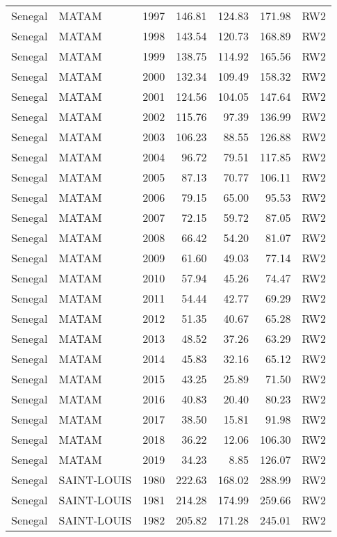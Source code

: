 \begin{longtable}{lllrrrl}
  Senegal & MATAM & 1997 & 146.81 & 124.83 & 171.98 & RW2 \\ 
  Senegal & MATAM & 1998 & 143.54 & 120.73 & 168.89 & RW2 \\ 
  Senegal & MATAM & 1999 & 138.75 & 114.92 & 165.56 & RW2 \\ 
  Senegal & MATAM & 2000 & 132.34 & 109.49 & 158.32 & RW2 \\ 
  Senegal & MATAM & 2001 & 124.56 & 104.05 & 147.64 & RW2 \\ 
  Senegal & MATAM & 2002 & 115.76 & 97.39 & 136.99 & RW2 \\ 
  Senegal & MATAM & 2003 & 106.23 & 88.55 & 126.88 & RW2 \\ 
  Senegal & MATAM & 2004 & 96.72 & 79.51 & 117.85 & RW2 \\ 
  Senegal & MATAM & 2005 & 87.13 & 70.77 & 106.11 & RW2 \\ 
  Senegal & MATAM & 2006 & 79.15 & 65.00 & 95.53 & RW2 \\ 
  Senegal & MATAM & 2007 & 72.15 & 59.72 & 87.05 & RW2 \\ 
  Senegal & MATAM & 2008 & 66.42 & 54.20 & 81.07 & RW2 \\ 
  Senegal & MATAM & 2009 & 61.60 & 49.03 & 77.14 & RW2 \\ 
  Senegal & MATAM & 2010 & 57.94 & 45.26 & 74.47 & RW2 \\ 
  Senegal & MATAM & 2011 & 54.44 & 42.77 & 69.29 & RW2 \\ 
  Senegal & MATAM & 2012 & 51.35 & 40.67 & 65.28 & RW2 \\ 
  Senegal & MATAM & 2013 & 48.52 & 37.26 & 63.29 & RW2 \\ 
  Senegal & MATAM & 2014 & 45.83 & 32.16 & 65.12 & RW2 \\ 
  Senegal & MATAM & 2015 & 43.25 & 25.89 & 71.50 & RW2 \\ 
  Senegal & MATAM & 2016 & 40.83 & 20.40 & 80.23 & RW2 \\ 
  Senegal & MATAM & 2017 & 38.50 & 15.81 & 91.98 & RW2 \\ 
  Senegal & MATAM & 2018 & 36.22 & 12.06 & 106.30 & RW2 \\ 
  Senegal & MATAM & 2019 & 34.23 & 8.85 & 126.07 & RW2 \\ 
  Senegal & SAINT-LOUIS & 1980 & 222.63 & 168.02 & 288.99 & RW2 \\ 
  Senegal & SAINT-LOUIS & 1981 & 214.28 & 174.99 & 259.66 & RW2 \\ 
  Senegal & SAINT-LOUIS & 1982 & 205.82 & 171.28 & 245.01 & RW2 \\ 

\end{longtable}
